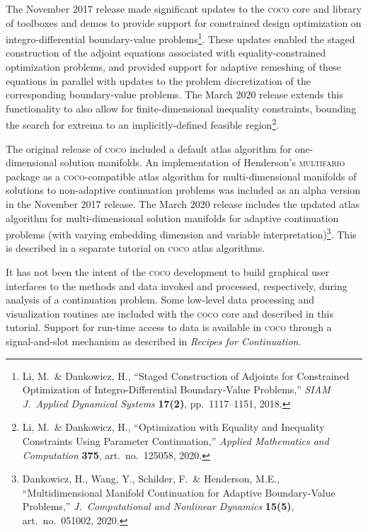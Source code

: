 The November 2017 release made significant updates to the \textsc{coco} core and library of toolboxes and demos to provide support for constrained design optimization on integro-differential boundary-value problems\footnote{Li, M.~\& Dankowicz, H., ``Staged Construction of Adjoints for Constrained Optimization of Integro-Differential Boundary-Value Problems,'' \emph{SIAM J.~Applied Dynamical Systems} \textbf{17(2)}, pp.~1117--1151, 2018.}. These updates enabled the staged construction of the adjoint equations associated with equality-constrained optimization problems, and provided support for adaptive remeshing of these equations in parallel with updates to the problem discretization of the corresponding boundary-value problems. The March 2020 release extends this functionality to also allow for finite-dimensional inequality constraints, bounding the search for extrema to an implicitly-defined feasible region\footnote{Li, M.~\& Dankowicz, H., ``Optimization with Equality and Inequality Constraints Using Parameter Continuation,'' \emph{Applied Mathematics and Computation} \textbf{375}, art.~no.~125058, 2020.}.

The original release of \textsc{coco} included a default atlas algorithm for one-dimensional solution manifolds. An implementation of Henderson's \textsc{multifario} package as a \textsc{coco}-compatible atlas algorithm for multi-dimensional manifolds of solutions to non-adaptive continuation problems was included as an alpha version in the November 2017 release. The March 2020 release includes the updated atlas algorithm  for multi-dimensional solution manifolds for adaptive continuation problems (with varying embedding dimension and variable interpretation)\footnote{Dankowicz, H., Wang, Y., Schilder, F.~\& Henderson, M.E., ``Multidimensional Manifold Continuation for Adaptive Boundary-Value Problems,'' \emph{J.~Computational and Nonlinear Dynamics} \textbf{15(5)}, art.~no.~051002, 2020.}. This is described in a separate tutorial on \textsc{coco} atlas algorithms.

It has not been the intent of the \textsc{coco} development to build graphical user interfaces to the methods and data invoked and processed, respectively, during analysis of a continuation problem. Some low-level data processing and visualization routines are included with the \textsc{coco} core and described in this tutorial. Support for run-time access to data is available in \textsc{coco} through a signal-and-slot mechanism as described in \emph{Recipes for Continuation}. 

